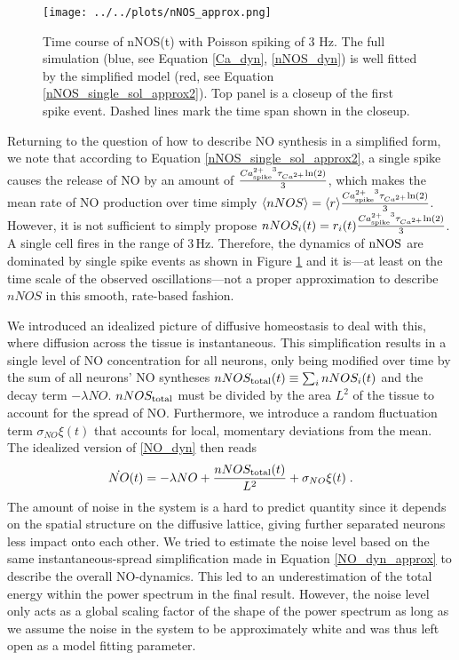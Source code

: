 \documentclass[10pt,a4paper]{article}
\begin{document}
\begin{figure}
\texttt{[image: ../../plots/nNOS\_approx.png]}
\caption[Time course of nNOS(t) with Poisson spiking of 3 Hz]{Time course of nNOS(t) with Poisson spiking of 3 Hz. The full simulation (blue, see Equation \eqref{Ca_dyn}, \eqref{nNOS_dyn}) is well fitted by the simplified model (red, see Equation \eqref{nNOS_single_sol_approx2}). Top panel is a closeup of the first spike event. Dashed lines mark the time span shown in the closeup.}
\label{nNOS_approx_plot}
\end{figure}

Returning to the question of how to describe NO synthesis in a simplified form, we note that according to Equation \eqref{nNOS_single_sol_approx2}, a single spike causes the release of NO by an amount of $\frac{{Ca^{2+}_{\rm spike}}^3 \tau_{Ca^{2+}}\mathrm{ln}(2)}{3}$, which makes the mean rate of NO production over time simply $\langle nNOS \rangle = \langle r \rangle \frac{{Ca^{2+}_{\rm spike}}^3 \tau_{Ca^{2+}} \mathrm{ln} (2)}{3}$. However, it is not sufficient to simply propose $nNOS_i(t) = r_i(t) \frac{{Ca^{2+}_{\rm spike}}^3 \tau_{Ca^{2+}} \mathrm{ln} (2)}{3}$. A single cell fires in the range of $\mathrm{3\,Hz}$. Therefore, the dynamics of $\rm nNOS$ are dominated by single spike events as shown in Figure \ref{nNOS_approx_plot} and it is---at least on the time scale of the observed oscillations---not a proper approximation to describe $nNOS$ in this smooth, rate-based fashion.

We introduced an idealized picture of diffusive homeostasis to deal with this, where diffusion across the tissue is instantaneous. This simplification results in a single level of NO concentration for all neurons, only being modified over time by the sum of all neurons' NO syntheses $nNOS_{\rm total}(t) \equiv \sum_{i} nNOS_i(t)$ and the decay term $-\lambda NO$. $nNOS_{\rm total}$ must be divided by the area $L^2$ of the tissue to account for the spread of NO. Furthermore, we introduce a random fluctuation term $\sigma_{NO} \xi(t)$ that accounts for local, momentary deviations from the mean. The idealized version of \eqref{NO_dyn} then reads
\begin{equation}
\dot{NO}(t)=-\lambda NO + \frac{nNOS_{\rm total}(t)}{L^2} + \sigma_{NO} \xi(t)\;.
\label{NO_dyn_approx}
\end{equation}
The amount of noise in the system is a hard to predict quantity since it depends on the spatial structure on the diffusive lattice, giving further separated neurons less impact onto each other. We tried to estimate the noise level based on the same instantaneous-spread simplification made in Equation \eqref{NO_dyn_approx} to describe the overall NO-dynamics. This led to an underestimation of the total energy within the power spectrum in the final result. However, the noise level only acts as a global scaling factor of the shape of the power spectrum as long as we assume the noise in the system to be approximately white and was thus left open as a model fitting parameter.
\end{document}
